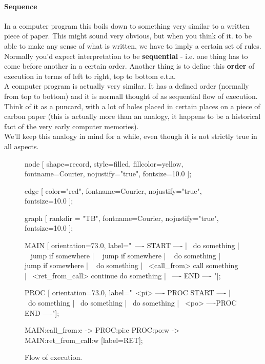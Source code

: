 	\paragraph{Sequence}

		In a computer program this boils down to something very similar to a written piece of paper. This might sound very obvious, but when you think of it. to be able to make any sense of what is written, we have to imply a certain set of rules. Normally you'd expect interpretation to be \textbf{sequential} - i.e. one thing has to come before another in a certain order. Another thing is to define this \textbf{order} of execution in terms of left to right, top to bottom e.t.a.
\\
		A computer program is actually very similar. It has a defined order (normally from top to bottom) and it is normall thought of as sequential flow of execution. Think of it as a puncard, with a lot of holes placed in certain places on a piece of carbon paper (this is actually more than an analogy, it happens to be a historical fact of the very early computer memories).
\\
		We'll keep this analogy in mind for a while, even though it is not strictly true in all aspects.
	\begin{figure}[!hbp]
	\begin{dotpic}
		node [
			shape=record,
			style=filled,
			fillcolor=yellow,
			fontname=Courier,
			nojustify="true",
			fontsize=10.0
		];

		edge [
			color="red",
			fontname=Courier,
			nojustify="true",
			fontsize=10.0
		];

		graph [
			rankdir = "TB",
			fontname=Courier,
			nojustify="true",
			fontsize=10.0
		];

		MAIN [ orientation=73.0, label="{\
			---- START ----         | \
			do something   | \
			<m1> jump if somewhere  | \
			<m2> jump if somewhere   | \
			<m3> do something   | \
			<m4> jump if somewhere   | \
			<m5> do something   | \
			<call_from> call something | \
			<ret_from_call> continue do something | \
			---- END ---- }"];

		PROC [ orientation=73.0, label="{\
			<pi>  ---- PROC START ---- | \
			do something   | \
			do something   | \
			do something   | \      
			<po>  ----PROC END ----}"];


		MAIN:call_from:e -> PROC:pi:e 
		PROC:po:w -> MAIN:ret_from_call:w [label=RET];
	\end{dotpic}
	\caption{Flow of execution.\label{execflow}}	
	\end{figure}

